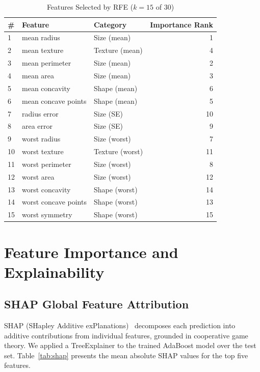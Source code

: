 \documentclass[10pt,letterpaper]{article}
\begin{document}
\begin{table}[h]
\centering
\caption{Features Selected by RFE ($k=15$ of 30)}
\label{tab:rfe_features}
\begin{tabular}{lllr}
\toprule
\textbf{\#} & \textbf{Feature} & \textbf{Category} & \textbf{Importance Rank} \\
\midrule
1  & mean radius         & Size (mean)           & 1 \\
2  & mean texture        & Texture (mean)        & 4 \\
3  & mean perimeter      & Size (mean)           & 2 \\
4  & mean area           & Size (mean)           & 3 \\
5  & mean concavity      & Shape (mean)          & 6 \\
6  & mean concave points & Shape (mean)          & 5 \\
7  & radius error        & Size (SE)             & 10 \\
8  & area error          & Size (SE)             & 9 \\
9  & worst radius        & Size (worst)          & 7 \\
10 & worst texture       & Texture (worst)       & 11 \\
11 & worst perimeter     & Size (worst)          & 8 \\
12 & worst area          & Size (worst)          & 12 \\
13 & worst concavity     & Shape (worst)         & 14 \\
14 & worst concave points & Shape (worst)        & 13 \\
15 & worst symmetry      & Shape (worst)         & 15 \\
\bottomrule
\end{tabular}
\end{table}

\section{Feature Importance and Explainability}

\subsection{SHAP Global Feature Attribution}

SHAP (SHapley Additive exPlanations)~\cite{lundberg2017} decomposes each prediction into additive
contributions from individual features, grounded in cooperative game theory. We applied a
TreeExplainer to the trained AdaBoost model over the test set.
Table~\ref{tab:shap} presents the mean absolute SHAP values for the top five features.
\end{document}
